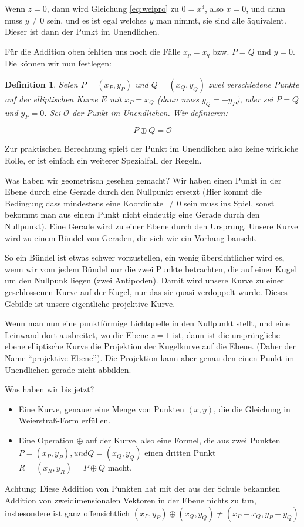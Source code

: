 \documentclass{article}
\newcounter{thm}
\newtheorem{definition}[thm]{Definition}
\begin{document}
Wenn $z = 0$, dann wird Gleichung \eqref{eq:weipro} zu $0 = x^3$, also
$x = 0$, und dann muss $y \ne 0$ sein, und es ist egal welches $y$ man nimmt,
sie sind alle äquivalent. Dieser ist dann der Punkt im Unendlichen.

Für die Addition oben fehlten uns noch die Fälle $x_p = x_q$ bzw. $P=Q$ und
$y=0$. Die können wir nun festlegen:

  \begin{definition}
    Seien $P = (x_P, y_P)$ und $Q =(x_Q, y_Q)$ zwei verschiedene Punkte auf der
    elliptischen Kurve $E$ mit $x_P = x_Q$ (dann muss $y_Q = -y_P$),
    oder sei $P = Q$ und $y_P = 0$.
    Sei $\mathcal{O}$ der Punkt im Unendlichen. Wir definieren:

    $$ P \oplus Q = \mathcal{O} $$
  \end{definition}

Zur praktischen Berechnung spielt der
Punkt im Unendlichen also keine wirkliche Rolle, er ist einfach ein weiterer
Spezialfall der Regeln.


Was haben wir geometrisch gesehen gemacht? Wir haben einen Punkt in der Ebene
durch eine Gerade durch den Nullpunkt ersetzt (Hier kommt die Bedingung dass
mindestens eine Koordinate $\ne 0$ sein muss ins Spiel, sonst bekommt man aus
einem Punkt nicht eindeutig eine Gerade durch den Nullpunkt).  Eine Gerade
wird zu einer Ebene durch den Ursprung. Unsere Kurve wird zu einem Bündel von
Geraden, die sich wie ein Vorhang bauscht.

So ein Bündel ist etwas schwer vorzustellen, ein wenig übersichtlicher wird
es, wenn wir vom jedem Bündel nur die zwei Punkte betrachten, die auf einer
Kugel um den Nullpunk liegen (zwei Antipoden). Damit wird unsere Kurve zu
einer geschlossenen Kurve auf der Kugel, nur das sie quasi verdoppelt
wurde. Dieses Gebilde ist unsere eigentliche projektive Kurve.

Wenn man nun eine punktförmige Lichtquelle in den Nullpunkt stellt, und eine
Leinwand dort ausbreitet, wo die Ebene $z =1$ ist, dann ist die ursprüngliche
ebene elliptische Kurve die Projektion der Kugelkurve auf die Ebene.
(Daher der Name ``projektive Ebene''). Die Projektion kann aber genau den
einen Punkt im Unendlichen gerade nicht abbilden.

Was haben wir bis jetzt?

\begin{itemize}
\item Eine Kurve, genauer eine Menge von Punkten $(x, y)$, die die Gleichung in
  Weierstraß-Form erfüllen.
\item Eine Operation $\oplus$ auf der Kurve, also eine Formel, die aus zwei Punkten
  $P = (x_P, y_P), und Q = (x_Q, y_Q)$ einen dritten Punkt
  $R = (x_R, y_R) = P \oplus Q$ macht.
\end{itemize}
Achtung: Diese Addition von Punkten hat mit der aus der Schule bekannten
Addition von zweidimensionalen Vektoren in der Ebene nichts zu tun,
insbesondere ist ganz offensichtlich
$(x_P, y_P) \oplus (x_Q, y_Q) \ne (x_P + x_Q, y_P + y_Q)$
\end{document}
